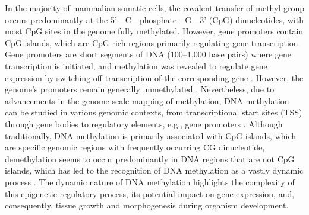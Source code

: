 \documentclass[
	a4paper, %
	10pt, %
	unnumberedsections, %
	twoside, %
]{LTJournalArticle}
\begin{document}
In the majority of mammalian somatic cells, the covalent transfer of methyl group 
occurs predominantly at the 
5'—C—phosphate—G—3' (CpG) dinucleotides, with most CpG sites in the genome fully 
methylated. However, gene promoters contain 
CpG islands, which are CpG-rich regions primarily regulating gene transcription. 
Gene promoters are short segments of DNA 
(100–1,000 base pairs) where gene transcription is initiated, and methylation was revealed 
to regulate gene expression by switching-off 
transcription of the corresponding gene \autocite{lim2019a, le2019a}. 
However, the genome's promoters remain generally unmethylated \autocite{mendoza2022a}. 
Nevertheless, due to advancements in the genome-scale mapping of methylation, 
DNA methylation can be studied in various genomic contexts, from 
transcriptional start sites (TSS) through gene bodies to regulatory elements, 
e.g., gene promoters \autocite{lim2019a, jones2012a}. Although 
traditionally, DNA methylation is primarily associated with CpG islands, 
which are specific genomic regions with frequently 
occurring CG dinucleotide, demethylation seems to occur predominantly in DNA regions 
that are not CpG islands, which has led 
to the recognition of DNA methylation as a vastly dynamic process \autocite{jones2012a}. 
The dynamic nature of DNA methylation highlights the 
complexity of this epigenetic regulatory process, its potential impact 
on gene expression, and, consequently, tissue 
growth and morphogenesis during organism development.
\end{document}
